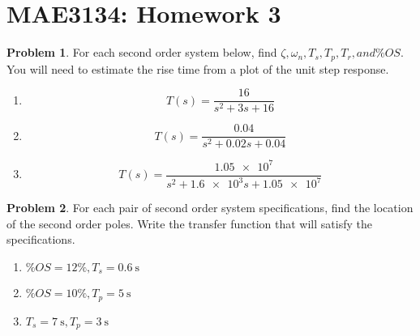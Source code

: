 \documentclass[10pt]{article}
\date{}
\theoremstyle{definition}
\newtheorem{prob}{Problem}[section]
\newenvironment{subprob}%
{\renewcommand{\theenumi}{\alph{enumi}}\renewcommand{\labelenumi}{(\theenumi)}\begin{enumerate}}%
{\end{enumerate}}%
\begin{document}
\pagestyle{empty}
\section*{MAE3134: Homework 3}
\vspace*{-0.4cm}

\begin{prob}
    For each second order system below, find \( \zeta , \omega_n, T_s, T_p, T_r, and \% OS\).
    You will need to estimate the rise time from a plot of the unit step response.
    \begin{subprob}
        \item \[ T(s) = \frac{16}{s^2 + 3s + 16}\]
        \item \[ T(s) = \frac{0.04}{s^2 + 0.02 s + 0.04}\]
        \item \[ T(s) = \frac{\num{1.05e7}}{s^2 + \num{1.6e3}s + \num{1.05e7}}\]
    \end{subprob}
\end{prob}

\begin{prob}
    For each pair of second order system specifications, find the location of the second order poles.
    Write the transfer function that will satisfy the specifications.
    \begin{subprob}
        \item \( \% OS = 12 \%, T_s = \SI{0.6}{\second}\)
        \item \( \% OS = 10 \%, T_p = \SI{5}{\second}\)
        \item \( T_s = \SI{7}{\second}, T_p = \SI{3}{\second}\)
    \end{subprob}
\end{prob}
\end{document}
